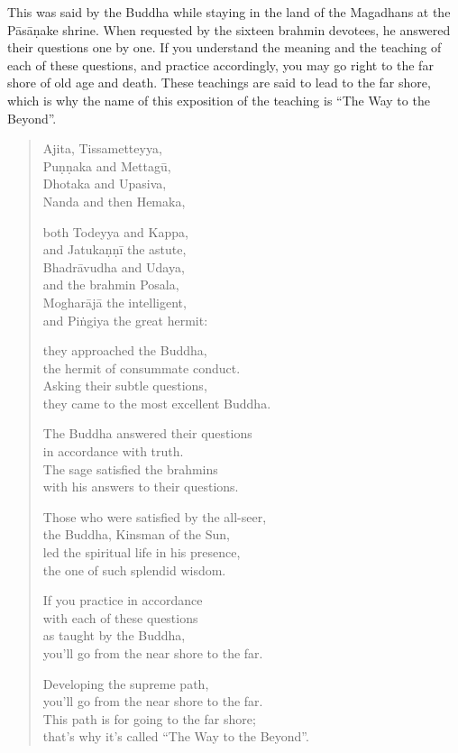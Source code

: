 \documentclass[12pt,openany]{book}%
\begin{document}
This was said by the Buddha while staying in the land of the Magadhans at the \textsanskrit{Pāsāṇake} shrine. When requested by the sixteen brahmin devotees, he answered their questions one by one. If you understand the meaning and the teaching of each of these questions, and practice accordingly, you may go right to the far shore of old age and death. These teachings are said to lead to the far shore, which is why the name of this exposition of the teaching is “The Way to the Beyond”. 

\begin{verse}%
Ajita, Tissametteyya, \\
\textsanskrit{Puṇṇaka} and \textsanskrit{Mettagū}, \\
Dhotaka and Upasiva, \\
Nanda and then Hemaka, 

both Todeyya and Kappa, \\
and \textsanskrit{Jatukaṇṇī} the astute, \\
\textsanskrit{Bhadrāvudha} and Udaya, \\
and the brahmin Posala, \\
\textsanskrit{Mogharājā} the intelligent, \\
and \textsanskrit{Piṅgiya} the great hermit: 

they approached the Buddha, \\
the hermit of consummate conduct. \\
Asking their subtle questions, \\
they came to the most excellent Buddha. 

The Buddha answered their questions \\
in accordance with truth. \\
The sage satisfied the brahmins \\
with his answers to their questions. 

Those who were satisfied by the all-seer, \\
the Buddha, Kinsman of the Sun, \\
led the spiritual life in his presence, \\
the one of such splendid wisdom. 

If you practice in accordance \\
with each of these questions \\
as taught by the Buddha, \\
you’ll go from the near shore to the far. 

Developing the supreme path, \\
you’ll go from the near shore to the far. \\
This path is for going to the far shore; \\
that’s why it’s called “The Way to the Beyond”. 

%
\end{verse}
\end{document}
